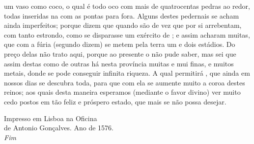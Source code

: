 um vaso como coco, o qual é todo oco com mais de quatrocentas pedras			%
ao redor, todas inseridas na  com as pontas para fora. Alguns
destes pedernais se acham ainda imperfeitos; porque dizem que quando			%
são de vez que por si arrebentam, com tanto estrondo, como se
disparasse um exército de ; e assim acharam muitas, que com a
fúria (segundo dizem) se metem pela terra um e dois estádios. Do preço
delas não trato aqui, porque ao presente o não pude saber, mas sei que
assim destas como de outras há nesta província muitas e mui finas, e
muitos metais, donde se pode conseguir infinita riqueza. A qual			%
permitirá , que ainda em nossos dias se descubra toda, para que com
ela se aumente muito a coroa destes reinos; aos quais desta maneira
esperamos (mediante o favor divino) ver muito cedo postos em tão feliz
e próspero estado, que mais se não possa desejar.



\vfill{}

\begin{center}
Impresso em Lisboa na Oficina\\
de Antonio Gonçalves.
Ano de 1576.\\
\textit{Fim}
\end{center}



%
%
%
